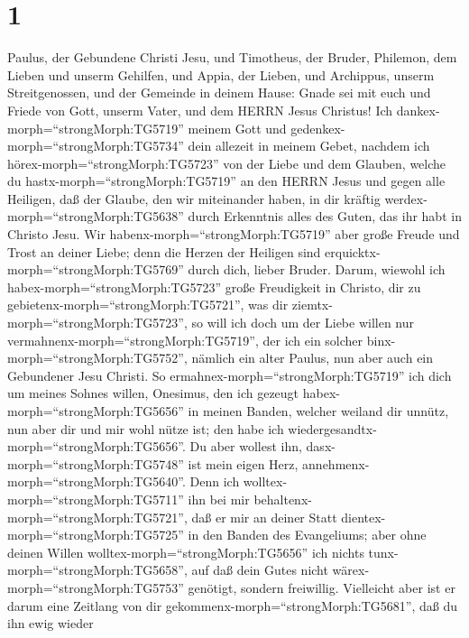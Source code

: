 \hypertarget{section}{%
\section{1}\label{section}}

 Paulus, der Gebundene Christi Jesu, und Timotheus, der
Bruder, Philemon, dem Lieben und unserm Gehilfen,  und
Appia, der Lieben, und Archippus, unserm Streitgenossen, und der
Gemeinde in deinem Hause:  Gnade sei mit euch und Friede von
Gott, unserm Vater, und dem HERRN Jesus Christus!  Ich
dankex-morph=``strongMorph:TG5719'' meinem Gott und
gedenkex-morph=``strongMorph:TG5734'' dein allezeit in meinem Gebet,
 nachdem ich hörex-morph=``strongMorph:TG5723'' von der
Liebe und dem Glauben, welche du hastx-morph=``strongMorph:TG5719'' an
den HERRN Jesus und gegen alle Heiligen,  daß der Glaube,
den wir miteinander haben, in dir kräftig
werdex-morph=``strongMorph:TG5638'' durch Erkenntnis alles des Guten,
das ihr habt in Christo Jesu.  Wir
habenx-morph=``strongMorph:TG5719'' aber große Freude und Trost an
deiner Liebe; denn die Herzen der Heiligen sind
erquicktx-morph=``strongMorph:TG5769'' durch dich, lieber Bruder.
 Darum, wiewohl ich habex-morph=``strongMorph:TG5723'' große
Freudigkeit in Christo, dir zu gebietenx-morph=``strongMorph:TG5721'',
was dir ziemtx-morph=``strongMorph:TG5723'',  so will ich
doch um der Liebe willen nur vermahnenx-morph=``strongMorph:TG5719'',
der ich ein solcher binx-morph=``strongMorph:TG5752'', nämlich ein alter
Paulus, nun aber auch ein Gebundener Jesu Christi.  So
ermahnex-morph=``strongMorph:TG5719'' ich dich um meines Sohnes willen,
Onesimus, den ich gezeugt habex-morph=``strongMorph:TG5656'' in meinen
Banden,  welcher weiland dir unnütz, nun aber dir und mir
wohl nütze ist; den habe ich
wiedergesandtx-morph=``strongMorph:TG5656''.  Du aber
wollest ihn, dasx-morph=``strongMorph:TG5748'' ist mein eigen Herz,
annehmenx-morph=``strongMorph:TG5640''.  Denn ich
wolltex-morph=``strongMorph:TG5711'' ihn bei mir
behaltenx-morph=``strongMorph:TG5721'', daß er mir an deiner Statt
dientex-morph=``strongMorph:TG5725'' in den Banden des Evangeliums;
 aber ohne deinen Willen
wolltex-morph=``strongMorph:TG5656'' ich nichts
tunx-morph=``strongMorph:TG5658'', auf daß dein Gutes nicht
wärex-morph=``strongMorph:TG5753'' genötigt, sondern freiwillig.
 Vielleicht aber ist er darum eine Zeitlang von dir
gekommenx-morph=``strongMorph:TG5681'', daß du ihn ewig wieder
